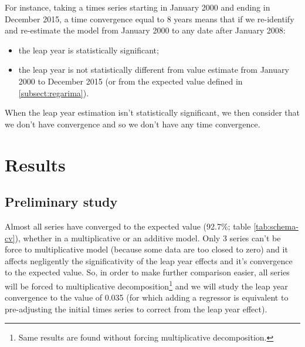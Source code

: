\documentclass[]{article}
\providecommand{\tightlist}{%
  \setlength{\itemsep}{0pt}\setlength{\parskip}{0pt}}
\let\rmarkdownfootnote\footnote%
\def\footnote{\protect\rmarkdownfootnote}
\theoremstyle{definition}
\theoremstyle{definition}
\theoremstyle{definition}
\theoremstyle{remark}
\begin{document}
For instance, taking a times series starting in January 2000 and ending
in December 2015, a time convergence equal to 8 years means that if we
re-identify and re-estimate the model from January 2000 to any date
after January 2008:

\begin{itemize}
\tightlist
\item
  the leap year is statistically significant;\\
\item
  the leap year is not statistically different from value estimate from
  January 2000 to December 2015 (or from the expected value defined in
  \ref{subsect:regarima}).
\end{itemize}

When the leap year estimation isn't statistically significant, we then
consider that we don't have convergence and so we don't have any time
convergence.

\section{Results}\label{results}

\subsection{Preliminary study}\label{preliminary-study}

Almost all series have converged to the expected value (92.7\%; table
\ref{tab:schema-cv}), whether in a multiplicative or an additive model.
Only 3 series can't be force to multiplicative model (because some data
are too closed to zero) and it affects negligently the significativity
of the leap year effects and it's convergence to the expected value. So,
in order to make further comparison easier, all series will be forced to
multiplicative decomposition\footnote{Same results are found without
  forcing multiplicative decomposition.} and we will study the leap year
convergence to the value of 0.035 (for which adding a regressor is
equivalent to pre-adjusting the initial times series to correct from the
leap year effect).
\end{document}
